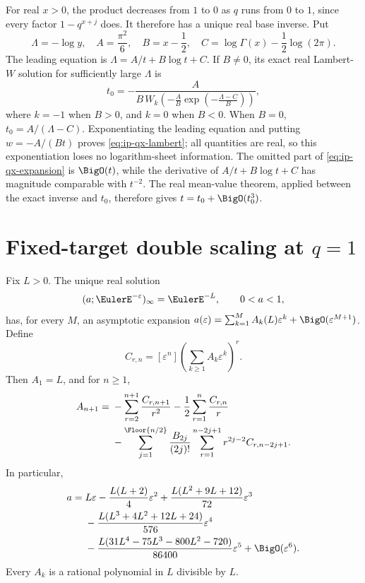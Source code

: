 For real \(x>0\), the product decreases from \(1\) to \(0\) as \(q\) runs from
\(0\) to \(1\), since every factor \(1-q^{x+j}\) does.  It therefore has a
unique real base inverse.  Put
\[
 \Lambda=-\log y,\quad A=\frac{\pi^2}{6},\quad
 B=x-\frac12,\quad C=\log\Gamma(x)-\frac12\log(2\pi).
\]
The leading equation is \(\Lambda=A/t+B\log t+C\).  If \(B\ne0\), its exact
real Lambert-\(W\) solution for sufficiently large \(\Lambda\) is
\begin{equation}
 t_0=-\frac{A}
 {B\,W_k\!\left(-\frac AB
 \exp\left(-\frac{\Lambda-C}{B}\right)\right)},
 \label{eq:ip-qx-lambert}
\end{equation}
where \(k=-1\) when \(B>0\), and \(k=0\) when \(B<0\).
When \(B=0\), \(t_0=A/(\Lambda-C)\).  Exponentiating the leading equation and
putting \(w=-A/(Bt)\) proves \cref{eq:ip-qx-lambert}; all quantities are real,
so this exponentiation loses no logarithm-sheet information.  The omitted
part of \cref{eq:ip-qx-expansion} is \(\BigO(t)\), while the derivative of
\(A/t+B\log t+C\) has magnitude comparable with \(t^{-2}\).  The real
mean-value theorem, applied between the exact inverse and \(t_0\), therefore
gives \(t=t_0+\BigO(t_0^3)\).

\section{\texorpdfstring{Fixed-target double scaling at \(q=1\)}{Fixed-target double scaling at q=1}}
\label{sec:ip-double-scaling}

\begin{theorem}
\label{thm:ip-double-scaling}
Fix \(L>0\).  The unique real solution
\[
 (a;\EulerE^{-\varepsilon})_\infty=\EulerE^{-L},\qquad 0<a<1,
\]
has, for every \(M\), an asymptotic expansion
\(a(\varepsilon)=\sum_{k=1}^{M}A_k(L)\varepsilon^k+
\BigO(\varepsilon^{M+1})\).  Define
\[
 C_{r,n}=[\varepsilon^n]
 \left(\sum_{k\geq1}A_k\varepsilon^k\right)^r.
\]
Then \(A_1=L\), and for \(n\geq1\),
\begin{align}
 A_{n+1}={}&-\sum_{r=2}^{n+1}\frac{C_{r,n+1}}{r^2}
 -\frac12\sum_{r=1}^{n}\frac{C_{r,n}}r \notag\\
 &-\sum_{j=1}^{\Floor{n/2}}
 \frac{B_{2j}}{(2j)!}
 \sum_{r=1}^{n-2j+1}r^{2j-2}C_{r,n-2j+1}.
 \label{eq:ip-double-scaling-recurrence}
\end{align}
In particular,
\begin{align}
 a={}&L\varepsilon-\frac{L(L+2)}4\varepsilon^2
 +\frac{L(L^2+9L+12)}{72}\varepsilon^3 \notag\\
 &-\frac{L(L^3+4L^2+12L+24)}{576}\varepsilon^4 \notag\\
 &-\frac{L(31L^4-75L^3-800L^2-720)}
 {86400}\varepsilon^5+\BigO(\varepsilon^6).
 \label{eq:ip-double-scaling-five}
\end{align}
Every \(A_k\) is a rational polynomial in \(L\) divisible by \(L\).
\end{theorem}

